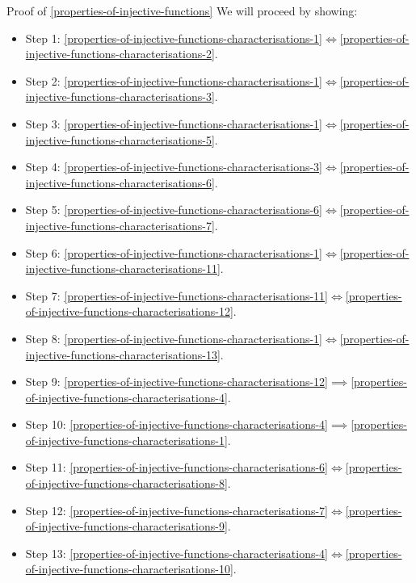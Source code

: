 \begin{Proof}{Proof of \cref{properties-of-injective-functions}}%
    We will proceed by showing:
    \begin{itemize}
        \item Step 1: \cref{properties-of-injective-functions-characterisations-1}$\iff$\cref{properties-of-injective-functions-characterisations-2}.
        \item Step 2: \cref{properties-of-injective-functions-characterisations-1}$\iff$\cref{properties-of-injective-functions-characterisations-3}.
        \item Step 3: \cref{properties-of-injective-functions-characterisations-1}$\iff$\cref{properties-of-injective-functions-characterisations-5}.
        \item Step 4: \cref{properties-of-injective-functions-characterisations-3}$\iff$\cref{properties-of-injective-functions-characterisations-6}.
        \item Step 5: \cref{properties-of-injective-functions-characterisations-6}$\iff$\cref{properties-of-injective-functions-characterisations-7}.
        \item Step 6: \cref{properties-of-injective-functions-characterisations-1}$\iff$\cref{properties-of-injective-functions-characterisations-11}.
        \item Step 7: \cref{properties-of-injective-functions-characterisations-11}$\iff$\cref{properties-of-injective-functions-characterisations-12}.
        \item Step 8: \cref{properties-of-injective-functions-characterisations-1}$\iff$\cref{properties-of-injective-functions-characterisations-13}.
        \item Step 9: \cref{properties-of-injective-functions-characterisations-12}$\implies$\cref{properties-of-injective-functions-characterisations-4}.
        \item Step 10: \cref{properties-of-injective-functions-characterisations-4}$\implies$\cref{properties-of-injective-functions-characterisations-1}.
        \item Step 11: \cref{properties-of-injective-functions-characterisations-6}$\iff$\cref{properties-of-injective-functions-characterisations-8}.
        \item Step 12: \cref{properties-of-injective-functions-characterisations-7}$\iff$\cref{properties-of-injective-functions-characterisations-9}.
        \item Step 13: \cref{properties-of-injective-functions-characterisations-4}$\iff$\cref{properties-of-injective-functions-characterisations-10}.
    \end{itemize}


\end{Proof}
